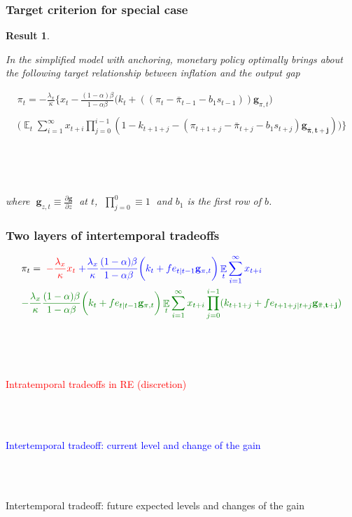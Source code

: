 \documentclass[11pt]{beamer}
\DeclareMathOperator{\E}{\mathbb{E}}
\newtheorem{result}{Result}
\begin{document}
\begin{frame}
	\frametitle{Target criterion for special case}
	\label{anchTC}
	
	\begin{result} 

\

In the simplified model with anchoring, monetary policy optimally brings about the following target relationship between inflation and the output gap
	
\begin{align*}
\pi_t  = -\frac{\lambda_x}{\kappa}\bigg\{x_t - \frac{(1-\alpha)\beta}{1-\alpha\beta} \bigg(k_t+((\pi_t - \bar{\pi}_{t-1}-b_1 s_{t-1}))\mathbf{g}_{\pi,t}\bigg) \\
\\
\bigg(\E_t\sum_{i=1}^{\infty}x_{t+i}\prod_{j=0}^{i-1}(1-k_{t+1+j} - (\pi_{t+1+j} - \bar{\pi}_{t+j}-b_1 s_{t+j})\mathbf{g_{\bar{\pi}, t+j}}) \bigg)
\bigg\}  \label{target}
\end{align*}

\

\

where $\; \mathbf{g}_{z,t} \equiv \frac{\partial \mathbf{g}}{\partial z}\;$ at $t$, $\; \prod_{j=0}^{0} \equiv 1 \; $ and $b_1$ is the first row of $b$.
	\end{result}
\vfill 

\hfill \hyperlink{generalTC}{}

\end{frame}

\begin{frame}
	\frametitle{Two layers of intertemporal tradeoffs}
\small{
\begin{align*}
& \pi_t  =  \; \textcolor{red}{-\frac{\lambda_x}{\kappa} x_t} \textcolor{blue}{ \; + \frac{\lambda_x}{\kappa} \frac{(1-\alpha)\beta}{1-\alpha\beta} \bigg(k_t+ fe_{t|t-1}\mathbf{g}_{\pi,t} \bigg)\E_t\sum_{i=1}^{\infty}x_{t+i}}  \\
& \textcolor{mygreen}{- \frac{\lambda_x}{\kappa} \frac{(1-\alpha)\beta}{1-\alpha\beta} \bigg(k_t+ fe_{t|t-1}\mathbf{g}_{\pi,t} \bigg)\E_t\sum_{i=1}^{\infty}x_{t+i}\prod_{j=0}^{i-1}(k_{t+1+j}+ fe_{t+1+j|t+j}\mathbf{g_{\bar{\pi},t+j}} )}
\end{align*}

\

\

\textcolor{red}{Intratemporal tradeoffs in RE (discretion)} \\

\

\

\textcolor{blue}{Intertemporal tradeoff: current level and change of the gain } \\

\

\

\textcolor{mygreen}{Intertemporal tradeoff: future expected levels and changes of the gain}

}
\end{frame}
\end{document}
